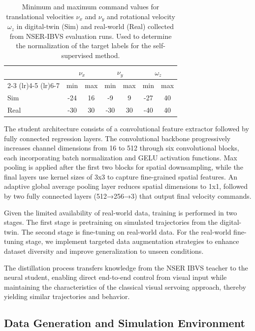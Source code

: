 \documentclass[10pt,twocolumn,letterpaper]{article}
\begin{document}
\begin{table}[h!]
    \centering
    \begin{tabular}{lcc|cc|cc}
        & \multicolumn{2}{c}{$\nu_{x}$} & \multicolumn{2}{c}{$\nu_{y}$} & \multicolumn{2}{c}{$\omega_{z}$} \\
        \cmidrule(lr){2-3} \cmidrule(lr){4-5} \cmidrule(lr){6-7}
        & min & max & min & max & min & max \\
        \hline
        Sim  & -24 & 16 & -9 & 9 & -27 & 40 \\
        Real & -30 & 30 & -30 & 30 & -40 & 40 \\
        \bottomrule
    \end{tabular}
    \caption{Minimum and maximum command values for translational velocities $\nu_{x}$ and $\nu_{y}$ and rotational velocity $\omega_{z}$ in digital-twin (Sim) and real-world (Real) collected from NSER-IBVS evaluation runs. Used to determine the normalization of the target labels for the self-supervised method.}
    \label{tab:cmd-values}
\end{table}

The student architecture consists of a convolutional feature extractor followed by fully connected regression layers. The convolutional backbone progressively increases channel dimensions from 16 to 512 through six convolutional blocks, each incorporating batch normalization and GELU activation functions. Max pooling is applied after the first two blocks for spatial downsampling, while the final layers use kernel sizes of 3x3 to capture fine-grained spatial features. An adaptive global average pooling layer reduces spatial dimensions to 1x1, followed by two fully connected layers (512→256→3) that output final velocity commands.

Given the limited availability of real-world data, training is performed in two stages. The first stage is pretraining on simulated trajectories from the digital-twin. The second stage is fine-tuning on real-world data. For the real-world fine-tuning stage, we implement targeted data augmentation strategies to enhance dataset diversity and improve generalization to unseen conditions.

The distillation process transfers knowledge from the NSER IBVS teacher to the neural student, enabling direct end-to-end control from visual input while maintaining the characteristics of the classical visual servoing approach, thereby yielding similar trajectories and behavior.


\subsection{Data Generation and Simulation Environment}
\label{sec:dataset_sim}
\end{document}
